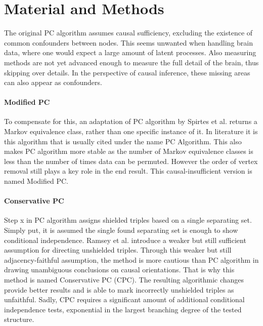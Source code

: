 \documentclass[a4paper, 10pt, english, onecolumn]{article}
\begin{document}
\section{Material and Methods}
The original PC algorithm assumes causal sufficiency, excluding the existence of common confounders between nodes.
This seems unwanted when handling brain data, where one would expect a large amount of latent processes.
Also measuring methods are not yet advanced enough to measure the full detail of the brain, thus skipping over details.
In the perspective of causal inference, these missing areas can also appear as confounders.

\paragraph{Modified PC}
To compensate for this, an adaptation of PC algorithm by Spirtes et al. returns a Markov equivalence class, rather than one specific instance of it.
In literature it is this algorithm that is usually cited under the name PC Algorithm.
This also makes PC algorithm more stable as the number of Markov equivalence classes is less than the number of times data can be permuted.
However the order of vertex removal still plays a key role in the end result.
This causal-insufficient version is named Modified PC.

\paragraph{Conservative PC}
Step x in PC algorithm assigns shielded triples based on a single separating set. %
Simply put, it is assumed the single found separating set is enough to show conditional independence. 
Ramsey et al. \cite{ramsey2012} introduce a weaker but still sufficient assumption for directing unshielded triples.
Through this weaker but still adjacency-faithful assumption, the method is more cautious than PC algorithm in drawing unambiguous conclusions on causal orientations.
That is why this method is named Conservative PC (CPC).
The resulting algorithmic changes provide better results and is able to mark incorrectly unshielded triples as unfaithful.
Sadly, CPC requires a significant amount of additional conditional independence tests, exponential in the largest branching degree of the tested structure.

\end{document}

